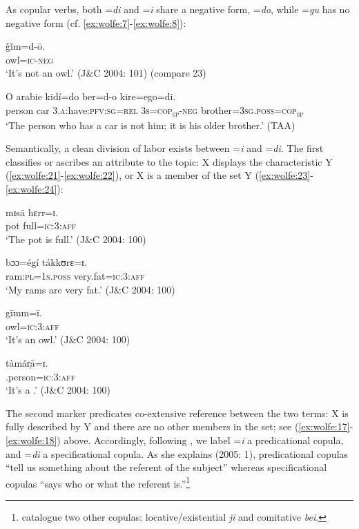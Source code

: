 \documentclass[output=paper,modfonts]{langscibook}
\begin{document}
As copular verbs, both =\textit{di} and =\textit{i} share a negative form, =\textit{do}, while =\textit{gu} has no negative form (cf. \ref{ex:wolfe:7}-\ref{ex:wolfe:8}):

\ea\label{ex:wolfe:19}
\gll \v{g}ǐm=d-\={o}.\\
     owl=\textsc{ic}-\textsc{neg}\\
\glt ‘It’s not an owl.’ (J\&C 2004: 101) (compare 23)
\z

\ea\label{ex:wolfe:20}
\gll O arabie kidí=do ber=d-o kire=ego=di.\\
     person car 3.\textsc{a}:have:\textsc{pfv}:\textsc{sg}=\textsc{rel} 3\textsc{s}=\textsc{cop}\textsc{\textsubscript{sp}}-\textsc{neg} brother=\textsc{3sg}.\textsc{poss}=\textsc{cop}\textsc{\textsubscript{sp}}\\
\glt ‘The person who has a car is not him; it is his older brother.’ (TAA)
\z

Semantically, a clean division of labor exists between =\textit{i} and =\textit{di}. The first classifies or ascribes an attribute to the topic: X displays the characteristic Y (\ref{ex:wolfe:21}-\ref{ex:wolfe:22}), or X is a member of the set Y (\ref{ex:wolfe:23}-\ref{ex:wolfe:24}):

\ea\label{ex:wolfe:21}
\gll mɪsā hɛrr=ɪ.\\
     pot full=\textsc{ic:3:aff}\\
\glt ‘The pot is full.’ (J\&C 2004: 100)
\z

\ea\label{ex:wolfe:22}
\gll bɔɔ=égí tákkʊrɛ=ɪ.\\
     ram:\textsc{pl}=1\textsc{s}.\textsc{poss} very.fat=\textsc{ic}:3:\textsc{aff}\\
\glt ‘My rams are very fat.’ (J\&C 2004: 100)
\z

\ea\label{ex:wolfe:23}
\gll gīmm=ī.\\
     owl=\textsc{ic}:3:\textsc{aff}\\
\glt ‘It’s an owl.’ (J\&C 2004: 100)
\z

\ea\label{ex:wolfe:24}
\gll tàmár̩ā=ɪ.\\
     .person=\textsc{ic}:3:\textsc{aff}\\
\glt ‘It’s a .’ (J\&C 2004: 100)
\z

The second marker predicates co-extensive reference between the two terms: X is fully described by Y and there are no other members in the set; see (\ref{ex:wolfe:17}-\ref{ex:wolfe:18}) above. Accordingly, following \citet{Mikkelsen2005}, we label =\textit{i} a predicational copula, and =\textit{di} a specificational copula. As she explains (2005: 1), predicational copulas “tell us something about the referent of the subject” whereas specificational copulas “says who or what the referent is.”\footnote{\citet[102--106]{JakobiCrass2004} catalogue two other  copulas: locative/existential \textit{ji} and comitative \textit{bei}.}
\end{document}
